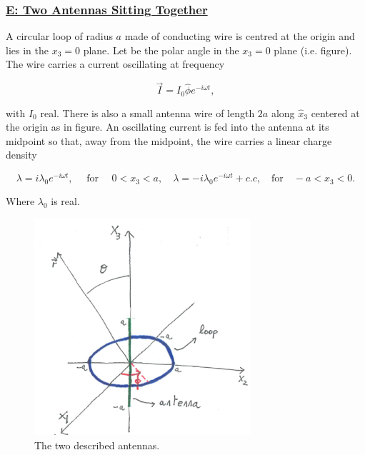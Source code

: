 \subsubsection{\hyperref[E: Two Antennas Sitting Together]{E: Two Antennas Sitting Together}}

A circular loop of radius $a$ made of conducting wire is centred at the origin and lies in the $x_{3}=0$ plane. Let
be the polar angle in the $x_{3}=0$ plane (i.e. figure). The wire carries a current oscillating at frequency

\begin{equation}
	\vec{I}=I_{0} \hat{\phi} e^{-i \omega t},
\end{equation}

with $I_{0}$ real. There is also a small antenna wire of length $2a$ along $\hat{x}_{3}$ centered at the origin as in figure. An oscillating current is fed into the antenna at its midpoint so that, away from the midpoint, the wire carries a linear charge density

\begin{equation}
	\lambda=i \lambda_{0} e^{-i \omega t} ,\quad \text { for } \quad 0<x_{3}<a, \quad \lambda=-i \lambda_{0} e^{-i \omega t}+c . c, \quad \text{for} \quad -a < x_{3} < 0.
\end{equation}

Where $\lambda_{0}$ is real.

\begin{figure}[htbp!]
	\includegraphics[width=8cm]{figures/p2examoct19.png}
	\centering
	\caption{The two described antennas.}
\end{figure}

